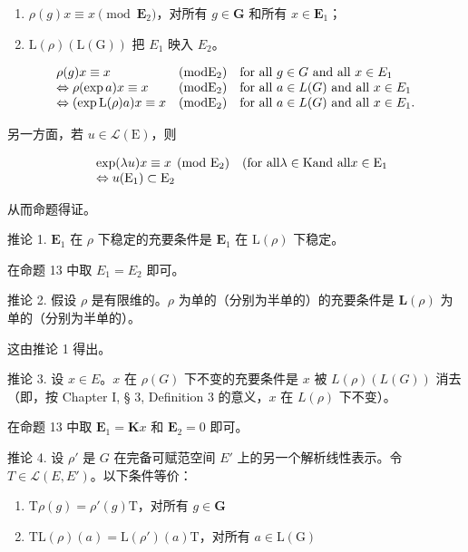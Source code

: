 \begin{enumerate}
\def\labelenumi{(\roman{enumi})}
\item
  \(\rho(g)x \equiv x \pmod{\mathbf{E}_2}\)，对所有 \(g \in \mathbf{G}\) 和所有 \(x \in \mathbf{E}_1\)；
\item
  \(\mathrm{L}(\rho)(\mathrm{L}(\mathrm{G}))\) 把 \(E_{1}\) 映入 \(E_{2}\)。
\end{enumerate}

\[
\begin{array}{l l l} \rho (g) x \equiv x & (\mathrm{mod} \mathrm{E} _ {2}) & \text {for all \(g\in G\) and all \(x\in E_{1}\)} \\ \Leftrightarrow \rho (\exp a) x \equiv x & (\mathrm{mod} \mathrm{E} _ {2}) & \text {for all \(a\in L(G)\) and all \(x\in E_{1}\)} \\ \Leftrightarrow (\exp \mathrm{L} (\rho) a) x \equiv x & (\mathrm{mod} \mathrm{E} _ {2}) & \text {for all \(a\in L(G)\) and all \(x\in E_{1}\)}. \end{array}
\]

另一方面，若 \(u \in \mathcal{L}(\mathrm{E})\)，则

\[
\begin{array}{r l} & \exp (\lambda u) x \equiv x \pmod {\mathrm{E} _ {2}} \quad \text {(for all} \lambda \in \mathrm{K} \text {and all} x \in \mathrm{E} _ {1} \\ & \Leftrightarrow u (\mathrm{E} _ {1}) \subset \mathrm{E} _ {2} \end{array}
\]

从而命题得证。

推论 1. \(\mathbf{E}_1\) 在 \(\rho\) 下稳定的充要条件是 \(\mathbf{E}_1\) 在 \(\mathrm{L}(\rho)\) 下稳定。

在命题 13 中取 \(E_{1} = E_{2}\) 即可。

推论 2. 假设 \(\rho\) 是有限维的。\(\rho\) 为单的（分别为半单的）的充要条件是 \(\mathbf{L}(\rho)\) 为单的（分别为半单的）。

这由推论 1 得出。

推论 3. 设 \(x \in E\)。\(x\) 在 \(\rho(G)\) 下不变的充要条件是 \(x\) 被 \(L(\rho)(L(G))\) 消去（即，按 Chapter I, § 3, Definition 3 的意义，\(x\) 在 \(L(\rho)\) 下不变）。

在命题 13 中取 \(\mathbf{E}_1 = \mathbf{K}x\) 和 \(\mathbf{E}_2 = 0\) 即可。

推论 4. 设 \(\rho'\) 是 \(G\) 在完备可赋范空间 \(E'\) 上的另一个解析线性表示。令 \(T \in \mathcal{L}(E, E')\)。以下条件等价：

\begin{enumerate}
\def\labelenumi{(\roman{enumi})}
\item
  \(\mathrm{T}\rho (g) = \rho '(g)\mathrm{T}\)，对所有 \(g\in \mathbf{G}\)
\item
  \(\mathrm{TL}(\rho)(a) = \mathrm{L}(\rho')(a)\mathrm{T}\)，对所有 \(a\in \mathrm{L}(\mathrm{G})\)
\end{enumerate}

